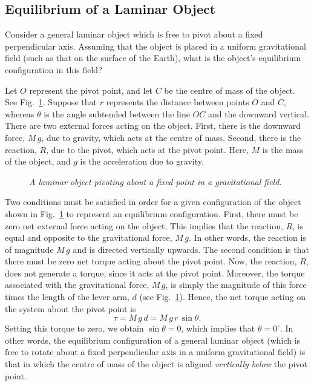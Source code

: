 \subsection{Equilibrium of a Laminar Object}\label{s103}
Consider a general laminar object which is free to pivot about a fixed perpendicular axis.
 Assuming that the object is placed in a uniform
gravitational field (such as that on the surface of the Earth), what is the object's equilibrium
configuration  in this field? 

Let $O$ represent  the pivot point, and let $C$ be the centre of mass of the object. See Fig.~\ref{f91}.
Suppose that $r$ represents the distance between points $O$ and $C$, whereas $\theta$ is
the angle subtended between the line $OC$ and the
downward vertical. There are two external forces acting on the object. First, there is the
downward force, $M\,g$, due to gravity, which acts at the centre of mass. Second, there is
the reaction, $R$, due to the pivot, which acts at the pivot point. Here, $M$ is the mass of the object, and $g$ is the
acceleration due to gravity. 

\begin{figure}
\epsfysize=2.5in
\centerline{}
\caption{\em A laminar object pivoting about a fixed point in a gravitational field.}\label{f91}  
\end{figure}

Two conditions must be satisfied in order for a given configuration of the
object shown in Fig.~\ref{f91} to represent
 an equilibrium configuration. First, there must be zero net external
force acting on the object. This implies that the reaction, $R$, is equal and
opposite to the gravitational force, $M\,g$. In other words, the reaction is of
magnitude $M\,g$ and is directed vertically upwards. The second condition
 is that there must be zero net torque acting about the pivot point. Now,
the reaction, $R$, does not generate a torque, since it acts at the pivot point.
Moreover, the torque associated with the gravitational force, $M\,g$, is simply the magnitude
of this force times the length of the lever arm, $d$ (see Fig.~\ref{f91}). Hence, the net torque
acting on the system about the pivot point is
\begin{equation}
\tau = M\,g\, d = M\,g\,r\,\sin\theta.
\end{equation}
Setting this torque to zero, we obtain $\sin\theta =0$, which implies that
$\theta = 0^\circ$. In other words, the equilibrium configuration of a general laminar
object (which is free to rotate about a fixed perpendicular axis in a uniform
gravitational field) is that in which  the centre of mass of the object is aligned {\em vertically
below} the pivot point.


